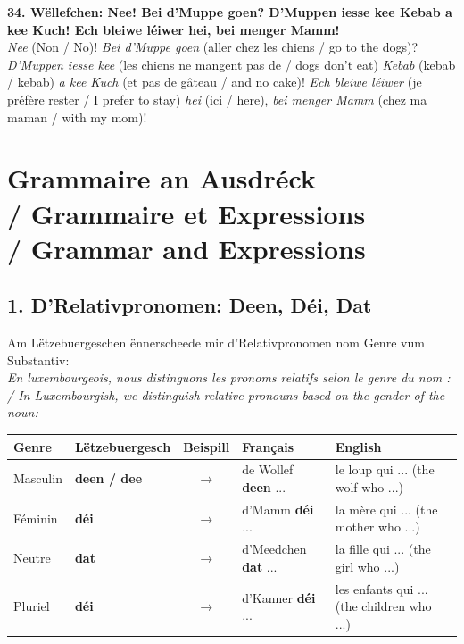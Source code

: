 \noindent\textbf{34. Wëllefchen: Nee! Bei d'Muppe goen? D'Muppen iesse kee Kebab a kee Kuch! Ech bleiwe léiwer hei, bei menger Mamm!}\\
\textit{Nee} (Non / No)! \textit{Bei d'Muppe goen} (aller chez les chiens / go to the dogs)? \textit{D'Muppen iesse kee} (les chiens ne mangent pas de / dogs don't eat) \textit{Kebab} (kebab / kebab) \textit{a kee Kuch} (et pas de gâteau / and no cake)! \textit{Ech bleiwe léiwer} (je préfère rester / I prefer to stay) \textit{hei} (ici / here), \textit{bei menger Mamm} (chez ma maman / with my mom)!\\[0.5em]

\vspace{1cm}

\section[Grammaire an Ausdréck / Grammaire / Grammar]{Grammaire an Ausdréck \\/ Grammaire et Expressions \\/ Grammar and Expressions}

\subsection*{1. D'Relativpronomen: Deen, Déi, Dat}

Am Lëtzebuergeschen ënnerscheede mir d'Relativpronomen nom Genre vum Substantiv: \\
\textit{En luxembourgeois, nous distinguons les pronoms relatifs selon le genre du nom : / In Luxembourgish, we distinguish relative pronouns based on the gender of the noun:}

\begin{tabular}{ll c l l}
    \toprule
    \textbf{Genre} & \textbf{Lëtzebuergesch} & \textbf{Beispill} & \textbf{Français} & \textbf{English} \\
    \midrule
    Masculin & \textbf{deen / dee} & $\rightarrow$ & de Wollef \textbf{deen} ... & le loup qui ... (the wolf who ...) \\
    Féminin & \textbf{déi} & $\rightarrow$ & d'Mamm \textbf{déi} ... & la mère qui ... (the mother who ...) \\
    Neutre & \textbf{dat} & $\rightarrow$ & d'Meedchen \textbf{dat} ... & la fille qui ... (the girl who ...) \\
    Pluriel & \textbf{déi} & $\rightarrow$ & d'Kanner \textbf{déi} ... & les enfants qui ... (the children who ...) \\
    \bottomrule
\end{tabular}
\\[0.5em]

